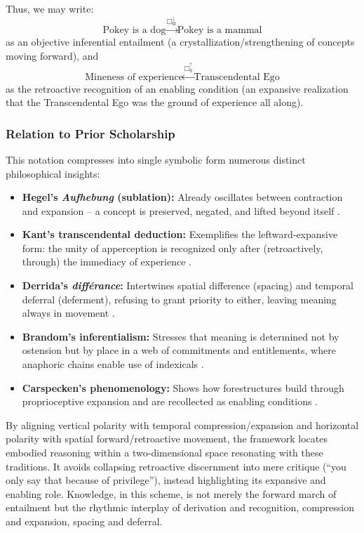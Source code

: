 \documentclass[12pt]{book}
\newcommand{\SBoxUp}{\Box_{\mathsf{S}}^{\uparrow}}
\newcommand{\OBoxDown}{\Box_{\mathsf{O}}^{\downarrow}}
\begin{document}
Thus, we may write:
\[
\text{Pokey is a dog} \xrightarrow{\,\OBoxDown\,} \text{Pokey is a mammal}
\]
as an objective inferential entailment (a crystallization/strengthening of concepts moving forward), and
\[
\text{Mineness of experience} \xleftarrow{\,\SBoxUp\,} \text{Transcendental Ego}
\]
as the retroactive recognition of an enabling condition (an expansive realization that the Transcendental Ego was the ground of experience all along).

\subsubsection{Relation to Prior Scholarship}

This notation compresses into single symbolic form numerous distinct philosophical insights:

\begin{itemize}
\item \textbf{Hegel's \textit{Aufhebung} (sublation):} Already oscillates between contraction and expansion -- a concept is preserved, negated, and lifted beyond itself \parencite{hegel1977phenomenology}.

\item \textbf{Kant's transcendental deduction:} Exemplifies the leftward-expansive form: the unity of apperception is recognized only after (retroactively, through) the immediacy of experience \parencite{Kant1781}.

\item \textbf{Derrida's \textit{différance}:} Intertwines spatial difference (spacing) and temporal deferral (deferment), refusing to grant priority to either, leaving meaning always in movement \parencite{Derrida:1973}.

\item \textbf{Brandom's inferentialism:} Stresses that meaning is determined not by ostension but by place in a web of commitments and entitlements, where anaphoric chains enable use of indexicals \parencite{brandom1994making,Brandom2008}.

\item \textbf{Carspecken's phenomenology:} Shows how forestructures build through proprioceptive expansion and are recollected as enabling conditions \parencite{Carspecken1999}.
\end{itemize}

By aligning vertical polarity with temporal compression/expansion and horizontal polarity with spatial forward/retroactive movement, the framework locates embodied reasoning within a two-dimensional space resonating with these traditions. It avoids collapsing retroactive discernment into mere critique (``you only say that because of privilege''), instead highlighting its expansive and enabling role. Knowledge, in this scheme, is not merely the forward march of entailment but the rhythmic interplay of derivation and recognition, compression and expansion, spacing and deferral.
\end{document}
